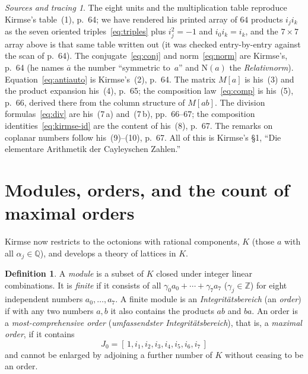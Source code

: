 \documentclass[11pt]{amsart}
\newcommand{\QQ}{\mathbb{Q}}
\newcommand{\ZZ}{\mathbb{Z}}
\newcommand{\Nm}{\mathrm{N}}
\newcommand{\cj}[1]{\overline{#1}}
\numberwithin{equation}{section}
\theoremstyle{definition}
\newtheorem{definition}{Definition}[section]
\theoremstyle{plain}
\theoremstyle{remark}
\newtheorem*{tracing}{Sources and tracing}
\begin{document}
\begin{tracing}
The eight units and the multiplication table reproduce Kirmse's table~(1),
\cite{Kirmse1924} p.~64; we have rendered his printed array of $64$ products
$i_j i_k$ as the seven oriented triples~\eqref{eq:triples} plus
$i_j^2=-1$ and $i_0 i_k=i_k$, and the $7\times7$ array above is that same
table written out (it was checked entry-by-entry against the scan of p.~64).
The conjugate~\eqref{eq:conj} and norm~\eqref{eq:norm} are Kirmse's, p.~64
(he names $\cj a$ the number ``symmetric to~$a$'' and $\Nm(a)$ the
\emph{Relativnorm}).  Equation~\eqref{eq:antiauto} is Kirmse's~(2), p.~64.
The matrix $M[a]$ is his~(3) and the product expansion his~(4), p.~65; the
composition law~\eqref{eq:comp} is his~(5), p.~66, derived there from the
column structure of $M[ab]$.  The division formulas~\eqref{eq:div} are
his~(7\,a) and~(7\,b), pp.~66--67; the composition
identities~\eqref{eq:kirmse-id} are the content of his~(8), p.~67.  The
remarks on coplanar numbers follow his~(9)--(10), p.~67.  All of this is
Kirmse's \S1, ``Die elementare Arithmetik der Cayleyschen Zahlen.''
\end{tracing}

\section{Modules, orders, and the count of maximal orders}\label{sec:orders}

Kirmse now restricts to the octonions with rational components, $K$
(those $a$ with all $\alpha_j\in\QQ$), and develops a theory of lattices
in $K$.

\begin{definition}
A \emph{module} is a subset of $K$ closed under integer linear combinations.
It is \emph{finite} if it consists of all $\gamma_0 a_0 + \cdots + \gamma_7 a_7$
($\gamma_j\in\ZZ$) for eight independent numbers $a_0,\ldots,a_7$.  A finite
module is an \emph{Integrit\"atsbereich} (an \emph{order}) if with any
two numbers $a,b$ it also contains the products $ab$ and $ba$.  An order is a
\emph{most-comprehensive order} (\emph{umfassendster Integrit\"atsbereich}),
that is, a \emph{maximal order}, if it contains
\begin{equation}\label{eq:J0}
  J_0 = [\,1, i_1, i_2, i_3, i_4, i_5, i_6, i_7\,]
\end{equation}
and cannot be enlarged by adjoining a further number of $K$ without ceasing
to be an order.
\end{definition}
\end{document}
